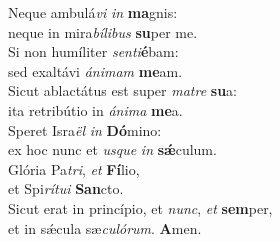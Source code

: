 \evenverse Neque ambulá\textit{vi} \textit{in} \textbf{ma}gnis:~\*\\
\evenverse neque in mira\textit{bí}\textit{li}\textit{bus} \textbf{su}per me.\\
\oddverse Si non humíliter \textit{sen}\textit{ti}\textbf{é}bam:~\*\\
\oddverse sed exaltávi \textit{á}\textit{ni}\textit{mam} \textbf{me}am.\\
\evenverse Sicut ablactátus est super \textit{ma}\textit{tre} \textbf{su}a:~\*\\
\evenverse ita retribútio in \textit{á}\textit{ni}\textit{ma} \textbf{me}a.\\
\oddverse Speret Isra\textit{ël} \textit{in} \textbf{Dó}mino:~\*\\
\oddverse ex hoc nunc et \textit{us}\textit{que} \textit{in} \textbf{sǽ}culum.\\
\evenverse Glória Pa\textit{tri}, \textit{et} \textbf{Fí}lio,~\*\\
\evenverse et Spi\textit{rí}\textit{tu}\textit{i} \textbf{San}cto.\\
\oddverse Sicut erat in princípio, et \textit{nunc}, \textit{et} \textbf{sem}per,~\*\\
\oddverse et in sǽcula sæ\textit{cu}\textit{ló}\textit{rum}. \textbf{A}men.\\
